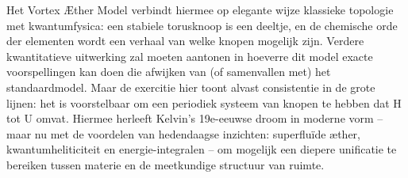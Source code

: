 Het Vortex Æther Model verbindt hiermee op elegante wijze klassieke topologie met kwantumfysica: een stabiele torusknoop is een deeltje, en de chemische orde der elementen wordt een verhaal van welke knopen mogelijk zijn. Verdere kwantitatieve uitwerking zal moeten aantonen in hoeverre dit model exacte voorspellingen kan doen die afwijken van (of samenvallen met) het standaardmodel. Maar de exercitie hier toont alvast consistentie in de grote lijnen: het is voorstelbaar om een periodiek systeem van knopen te hebben dat H tot U omvat. Hiermee herleeft Kelvin's 19e-eeuwse droom in moderne vorm – maar nu met de voordelen van hedendaagse inzichten: superfluïde æther, kwantumheliticiteit en energie-integralen – om mogelijk een diepere unificatie te bereiken tussen materie en de meetkundige structuur van ruimte.